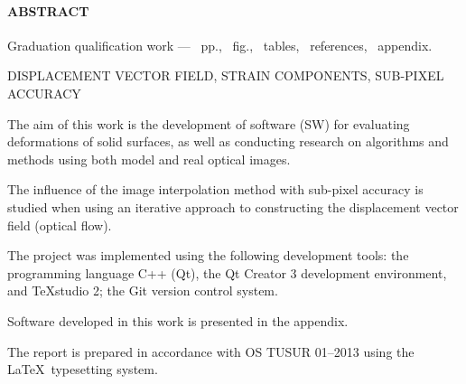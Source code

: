\newpage
{}
\paragraph{\hfill ABSTRACT \hfill}
Graduation qualification work --- ~pp., ~fig., ~tables, ~references, ~appendix.

DISPLACEMENT VECTOR FIELD, STRAIN COMPONENTS, SUB-PIXEL ACCURACY

The aim of this work is the development of software (SW) for evaluating deformations of solid surfaces, as well as conducting research on algorithms and methods using both model and real optical images.

The influence of the image interpolation method with sub-pixel accuracy is studied when using an iterative approach to constructing the displacement vector field (optical flow).

The project was implemented using the following development tools: the programming language C++ (Qt), the Qt Creator 3 development environment, and TeXstudio 2; the Git version control system.

Software developed in this work is presented in the appendix.

The report is prepared in accordance with OS TUSUR 01--2013 using the \LaTeX\ typesetting system.
